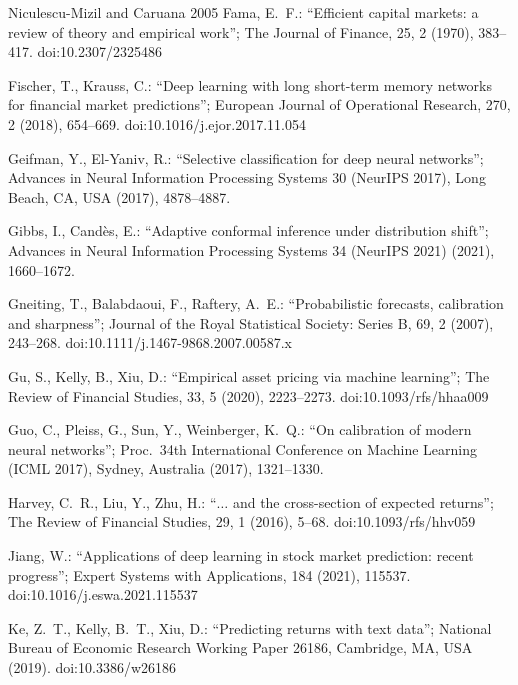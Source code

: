 \documentclass[10pt,a4paper,oneside]{article}
\theoremstyle{definition}
\theoremstyle{plain}
\begin{document}
{\begin{thebibliography}{Niculescu-Mizil and Caruana 2005}
Fama, E.\ F.: ``Efficient capital markets: a review of theory and empirical work'';
The Journal of Finance, 25, 2 (1970), 383--417. doi:10.2307/2325486

Fischer, T., Krauss, C.: ``Deep learning with long short-term memory networks for
financial market predictions''; European Journal of Operational Research, 270, 2
(2018), 654--669. doi:10.1016/j.ejor.2017.11.054

Geifman, Y., El-Yaniv, R.: ``Selective classification for deep neural networks'';
Advances in Neural Information Processing Systems 30 (NeurIPS 2017), Long Beach, CA,
USA (2017), 4878--4887.

Gibbs, I., Cand\`es, E.: ``Adaptive conformal inference under distribution shift'';
Advances in Neural Information Processing Systems 34 (NeurIPS 2021) (2021),
1660--1672.

Gneiting, T., Balabdaoui, F., Raftery, A.\ E.: ``Probabilistic forecasts, calibration
and sharpness''; Journal of the Royal Statistical Society: Series B, 69, 2 (2007),
243--268. doi:10.1111/j.1467-9868.2007.00587.x

Gu, S., Kelly, B., Xiu, D.: ``Empirical asset pricing via machine learning''; The
Review of Financial Studies, 33, 5 (2020), 2223--2273. doi:10.1093/rfs/hhaa009

Guo, C., Pleiss, G., Sun, Y., Weinberger, K.\ Q.: ``On calibration of modern neural
networks''; Proc.\ 34th International Conference on Machine Learning (ICML 2017),
Sydney, Australia (2017), 1321--1330.

Harvey, C.\ R., Liu, Y., Zhu, H.: ``$\ldots$ and the cross-section of expected
returns''; The Review of Financial Studies, 29, 1 (2016), 5--68.
doi:10.1093/rfs/hhv059

Jiang, W.: ``Applications of deep learning in stock market prediction: recent
progress''; Expert Systems with Applications, 184 (2021), 115537.
doi:10.1016/j.eswa.2021.115537

Ke, Z.\ T., Kelly, B.\ T., Xiu, D.: ``Predicting returns with text data''; National
Bureau of Economic Research Working Paper 26186, Cambridge, MA, USA (2019).
doi:10.3386/w26186


\end{thebibliography}}
\end{document}
